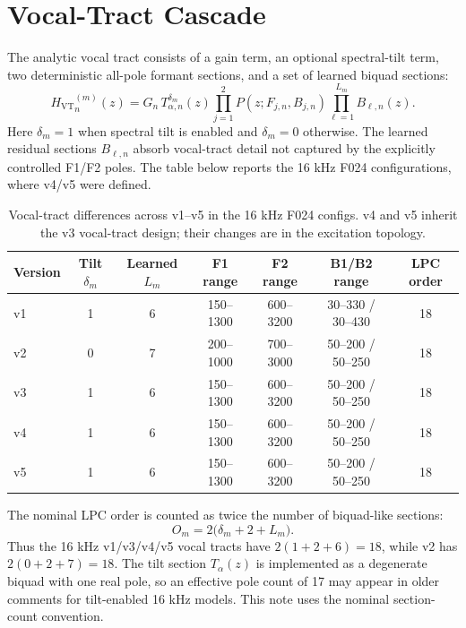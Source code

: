 \documentclass[11pt]{article}
\newcommand{\vt}{H_{\mathrm{VT}}}
\newcommand{\biquad}{B}
\newcommand{\pole}{P}
\begin{document}
\section{Vocal-Tract Cascade}

The analytic vocal tract consists of a gain term, an optional spectral-tilt
term, two deterministic all-pole formant sections, and a set of learned
biquad sections:
\begin{equation}
  {\vt}^{(m)}_n(z)
  =
  G_n
  \, T_{\alpha,n}^{\delta_m}(z)
  \prod_{j=1}^{2} \pole(z; F_{j,n}, B_{j,n})
  \prod_{\ell=1}^{L_m} \biquad_{\ell,n}(z).
  \label{eq:vt-general}
\end{equation}
Here $\delta_m=1$ when spectral tilt is enabled and $\delta_m=0$ otherwise.
The learned residual sections $\biquad_{\ell,n}$ absorb vocal-tract detail
not captured by the explicitly controlled F1/F2 poles. The table below reports
the 16 kHz F024 configurations, where v4/v5 were defined.

\begin{table}[H]
\centering
\small
\begin{tabular}{@{}lcccccc@{}}
\toprule
Version & Tilt $\delta_m$ & Learned $L_m$ & F1 range & F2 range & B1/B2 range & LPC order \\
\midrule
v1 & 1 & 6 & 150--1300 & 600--3200 & 30--330 / 30--430 & 18 \\
v2 & 0 & 7 & 200--1000 & 700--3000 & 50--200 / 50--250 & 18 \\
v3 & 1 & 6 & 150--1300 & 600--3200 & 50--200 / 50--250 & 18 \\
v4 & 1 & 6 & 150--1300 & 600--3200 & 50--200 / 50--250 & 18 \\
v5 & 1 & 6 & 150--1300 & 600--3200 & 50--200 / 50--250 & 18 \\
\bottomrule
\end{tabular}
\caption{Vocal-tract differences across v1--v5 in the 16 kHz F024 configs.
v4 and v5 inherit the v3 vocal-tract design; their changes are in the
excitation topology.}
\end{table}

The nominal LPC order is counted as twice the number of biquad-like sections:
\begin{equation}
  O_m = 2\bigl(\delta_m + 2 + L_m\bigr).
\end{equation}
Thus the 16 kHz v1/v3/v4/v5 vocal tracts have
$2(1+2+6)=18$, while v2 has $2(0+2+7)=18$. The tilt section
$T_{\alpha}(z)$ is implemented as a degenerate biquad with one real pole,
so an effective pole count of 17 may appear in older comments for tilt-enabled
16 kHz models. This note uses the nominal section-count convention.
\end{document}
